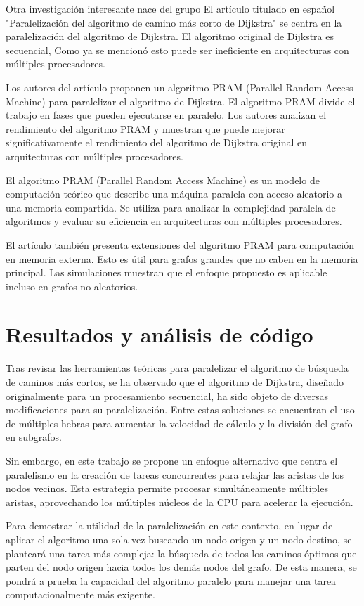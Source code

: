 Otra investigación interesante nace del grupo \cite{Crauser} El artículo titulado en español "Paralelización del algoritmo de camino más corto de Dijkstra" se centra en la paralelización del algoritmo de Dijkstra. El algoritmo original de Dijkstra es secuencial, Como ya se mencionó esto puede ser ineficiente en arquitecturas con múltiples procesadores.

Los autores del artículo proponen un algoritmo PRAM (Parallel Random Access Machine) para paralelizar el algoritmo de Dijkstra. El algoritmo PRAM divide el trabajo en fases que pueden ejecutarse en paralelo. Los autores analizan el rendimiento del algoritmo PRAM y muestran que puede mejorar significativamente el rendimiento del algoritmo de Dijkstra original en arquitecturas con múltiples procesadores.

El algoritmo PRAM (Parallel Random Access Machine) es un modelo de computación teórico que describe una máquina paralela con acceso aleatorio a una memoria compartida. Se utiliza para analizar la complejidad paralela de algoritmos y evaluar su eficiencia en arquitecturas con múltiples procesadores.

El artículo también presenta extensiones del algoritmo PRAM para computación en memoria externa. Esto es útil para grafos grandes que no caben en la memoria principal. Las simulaciones muestran que el enfoque propuesto es aplicable incluso en grafos no aleatorios.


\section{Resultados y análisis de código}

Tras revisar las herramientas teóricas para paralelizar el algoritmo de búsqueda de caminos más cortos, se ha observado que el algoritmo de Dijkstra, diseñado originalmente para un procesamiento secuencial, ha sido objeto de diversas modificaciones para su paralelización. Entre estas soluciones se encuentran el uso de múltiples hebras para aumentar la velocidad de cálculo y la división del grafo en subgrafos.

Sin embargo, en este trabajo se propone un enfoque alternativo que centra el paralelismo en la creación de tareas concurrentes para relajar las aristas de los nodos vecinos. Esta estrategia permite procesar simultáneamente múltiples aristas, aprovechando los múltiples núcleos de la CPU para acelerar la ejecución.

Para demostrar la utilidad de la paralelización en este contexto, en lugar de aplicar el algoritmo una sola vez buscando un nodo origen y un nodo destino, se planteará una tarea más compleja: la búsqueda de todos los caminos óptimos que parten del nodo origen hacia todos los demás nodos del grafo. De esta manera, se pondrá a prueba la capacidad del algoritmo paralelo para manejar una tarea computacionalmente más exigente.


